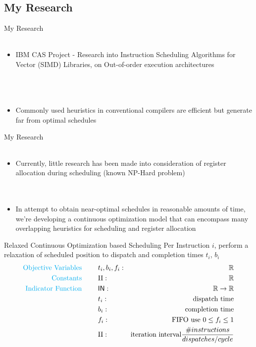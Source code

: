 \documentclass{beamer}
\begin{document}
\begin{darkframes}
\section{My Research}
\begin{frame}{My Research}
    \qquad \\
    \qquad \\
    \begin{itemize}
        \item IBM CAS Project - Research into Instruction Scheduling Algorithms for Vector (SIMD) Libraries, on Out-of-order execution architectures \\
        \qquad \\
        \qquad \\
        \qquad \\
        \pause
        \item Commonly used heuristics in conventional compilers are efficient but generate far from optimal schedules  \\
    \end{itemize}
\end{frame}

\begin{frame}{My Research}
    \qquad \\
    \qquad \\
    \begin{itemize}
        \item Currently, little research has been made into consideration of register allocation during scheduling (known NP-Hard problem) \\
        \qquad \\
        \qquad \\
        \pause
        \item In attempt to obtain near-optimal schedules in reasonable amounts of time, we're developing a continuous optimization model that can encompass many overlapping heuristics for scheduling and register allocation
    \end{itemize}
\end{frame}

\begin{frame}{Relaxed Continuous Optimization based Scheduling}
    Per Instruction $i$, perform a relaxation of scheduled position to dispatch and completion times $t_i$, $b_i$
    \begin{align*}
    \text{\color{cyan} Objective Variables \qquad} & t_i, b_i, f_i:& \mathbb{R} \\
    \text{\color{cyan} Constants \qquad} & \textrm{II} :& \mathbb{R} \\
    \text{\color{cyan} Indicator Function \qquad} & \mathsf{IN} :& \mathbb{R} \rightarrow \mathbb{R} \\
    & t_i :& \text{dispatch time} \\
    & b_i :& \text{completion time} \\
    & f_i :& \text{FIFO use } 0 \leq f_i \leq 1 \\
    & \textrm{II} :& \text{iteration interval} \frac{\# instructions}{dispatches/cycle} \\
    \end{align*}
   

\end{frame}
\end{darkframes}
\end{document}
